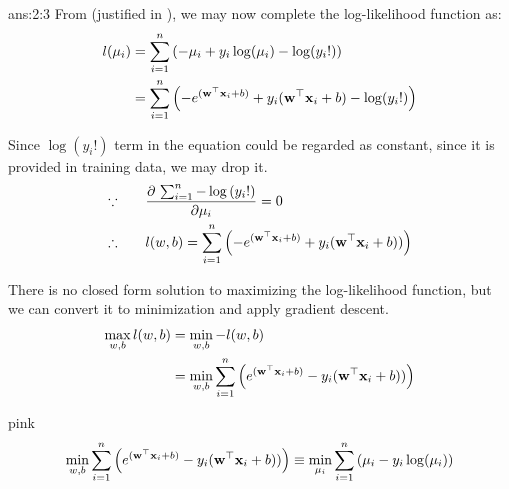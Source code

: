 \documentclass{tron}
\begin{document}
\newpage
\begin{answer}{ans:2:3}
	From  (justified in ), we may now complete the log-likelihood function as:
	\begin{align}
		l(\mu_i) 	& = \sum_{i=1}^n \left(  -\mu_i + {y_i}\log(\mu_i) - \log({y_i}!) \right) \\
					& = \sum_{i=1}^n \left(  - e^{(\mathbf{w}^\top \mathbf{x}_i + b)} + {y_i}(\mathbf{w}^\top \mathbf{x}_i + b) - \log({y_i}!) \right) 
	\end{align}

	Since $\log(y_i !)$ term in the equation could be regarded as constant, since it is provided in training data, we may drop it.
	\begin{align}
		\because \qquad & \frac{\partial \, \sum_{i=1}^{n} - \log{(y_i!)}}{\partial \mu_i} = 0 \\
		\therefore \qquad &	l(w, b) = \sum_{i=1}^n \left(  - e^{(\mathbf{w}^\top \mathbf{x}_i + b)} + {y_i}(\mathbf{w}^\top \mathbf{x}_i + b)) \right) 
	\end{align}
	
	There is no closed form solution to maximizing the log-likelihood function, but we can convert it to minimization and apply gradient descent.
	\begin{align}
		\max_{w,b} l(w, b) & = \min_{w,b} - l(w, b) \\
							&= \min_{w,b} \sum_{i=1}^n \left(  e^{(\mathbf{w}^\top \mathbf{x}_i + b)} - {y_i}(\mathbf{w}^\top \mathbf{x}_i + b)) \right)
	\end{align}
	
	\begin{note}{pink}{}
		\begin{equation}
		\min_{w,b} \sum_{i=1}^n \left(  e^{(\mathbf{w}^\top \mathbf{x}_i + b)} - {y_i}(\mathbf{w}^\top \mathbf{x}_i + b)) \right) \equiv \min_{\mu_i} \sum_{i=1}^n \left(  \mu_i - {y_i}\log(\mu_i) \right) \label{eqn:objective-func}
		\end{equation}	
	\end{note}

\end{answer}
\end{document}

